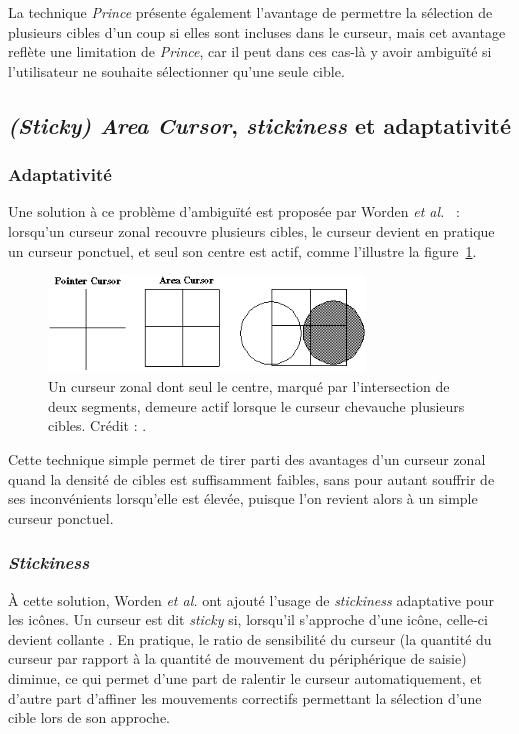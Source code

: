 	La technique \emph{Prince} présente également l'avantage de permettre la sélection de plusieurs cibles d'un coup si elles sont incluses dans le curseur, mais cet avantage reflète une limitation de \emph{Prince}, car il peut dans ces cas-là y avoir ambiguïté si l'utilisateur ne souhaite sélectionner qu'une seule cible.
	
	\subsection{\emph{(Sticky) Area Cursor}, \emph{stickiness} et adaptativité}
		\subsubsection{Adaptativité}
	Une solution à ce problème d'ambiguïté est proposée par Worden \emph{et al.}~\cite{worden1997making} : lorsqu'un curseur zonal recouvre plusieurs cibles, le curseur devient en pratique un curseur ponctuel, et seul son centre est actif, comme l'illustre la figure~\ref{fig:areaCursor}.
	
	\begin{figure}[!htb]
		\centering
		\includegraphics[width=0.75\textwidth]{figures/ch2/areaCursor}
		\caption[\emph{Area Cursor} avec \emph{hot spot}]{Un curseur zonal dont seul le centre, marqué par l'intersection de deux segments, demeure actif lorsque le curseur chevauche plusieurs cibles. Crédit : \cite{worden1997making}.}
		\label{fig:areaCursor}
	\end{figure}
	
	Cette technique simple permet de tirer parti des avantages d'un curseur zonal quand la densité de cibles est suffisamment faibles, sans pour autant souffrir de ses inconvénients lorsqu'elle est élevée, puisque l'on revient alors à un simple curseur ponctuel.
	
		\subsubsection{\emph{Stickiness}}
	À cette solution, Worden \emph{et al.} ont ajouté l'usage de \emph{stickiness} adaptative pour les icônes. Un curseur est dit \emph{sticky} si, lorsqu'il s'approche d'une icône, celle-ci devient \og collante \fg{}. En pratique, le ratio de sensibilité du curseur (la quantité du curseur par rapport à la quantité de mouvement du périphérique de saisie) diminue, ce qui permet d'une part de ralentir le curseur automatiquement, et d'autre part d'affiner les mouvements correctifs permettant la sélection d'une cible lors de son approche.
	
